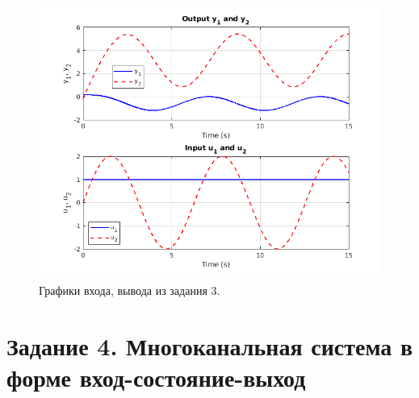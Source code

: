 \begin{figure}[htbp]
    \centering
    \includegraphics[width=1\linewidth]{figs/task_3_out.png}
    \caption{Графики входа, вывода из задания 3.}
    \label{fig:task3_out}
\end{figure}



\section*{Задание 4. Многоканальная система в форме вход-состояние-выход}

